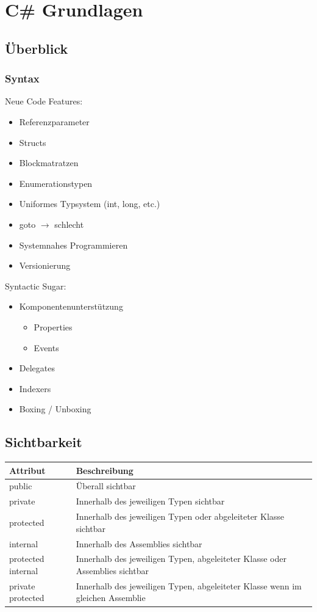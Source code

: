 
\section{C\# Grundlagen}

\subsection{Überblick}
\subsubsection{Syntax}
Neue Code Features:
\begin{itemize}
    \item Referenzparameter
    \item Structs
    \item Blockmatratzen
    \item Enumerationstypen
    \item Uniformes Typsystem (int, long, etc.)
    \item goto $\rightarrow$ schlecht
    \item Systemnahes Programmieren
    \item Versionierung
\end{itemize}
Syntactic Sugar:
\begin{itemize}
    \item Komponentenunterstützung
    \begin{itemize}
        \item Properties
        \item Events
    \end{itemize}
    \item Delegates
    \item Indexers
    \item Boxing / Unboxing
\end{itemize}

\subsection{Sichtbarkeit}
\begin{tabular}{p{1cm} | p{7cm}}
    Attribut & Beschreibung\\
    \hline
    public & Überall sichtbar\\
    private & Innerhalb des jeweiligen Typen sichtbar\\
    protected & Innerhalb des jeweiligen Typen oder abgeleiteter Klasse sichtbar\\
    internal & Innerhalb des Assemblies sichtbar\\
    protected internal & Innerhalb des jeweiligen Typen, abgeleiteter Klasse oder Assemblies sichtbar\\
    private protected & Innerhalb des jeweiligen Typen, abgeleiteter Klasse wenn im gleichen Assemblie\\
\end{tabular}

